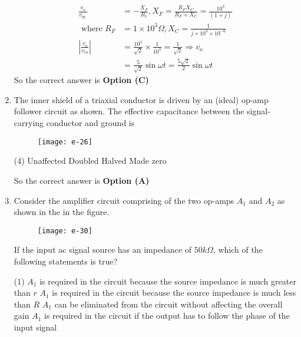 \begin{enumerate}
\begin{answer}
	\begin{align*}
	\frac{v_{o}}{v_{\text {in }}}&=-\frac{X_{F}}{R_{1}}, X_{F}=\frac{R_{F} X_{C}}{R_{F}+X_{C}}=\frac{10^{3}}{(1+j)}\\\text{ where }R_{F}&=1 \times 10^{3} \Omega, X_{C}=\frac{1}{j \times 10^{3} \times 10^{-6}}\\
	\left|\frac{v_{o}}{v_{i n}}\right|&=\frac{10^{3}}{\sqrt{2}} \times \frac{1}{10^{3}}=\frac{1}{\sqrt{2}} \Rightarrow v_{o}\\&=\frac{5}{\sqrt{2}} \sin \omega t=\frac{5 \sqrt{2}}{2} \sin \omega t
	\end{align*}
	So the correct answer is \textbf{Option (C)}
\end{answer}
	\item The inner shield of a triaxial conductor is driven by an (ideal) op-amp follower circuit as shown. The effective capacitance between the signal-carrying conductor and ground is
	{	}
	\begin{figure}[H]
		\centering
		\texttt{[image: e-26]}
	\end{figure}
	\begin{tasks}(4)
		\task[\textbf{A.}]  Unaffected
		\task[\textbf{B.}] Doubled
		\task[\textbf{C.}] Halved
		\task[\textbf{D.}] Made zero
	\end{tasks}
\begin{answer}
	So the correct answer is \textbf{Option (A)}
\end{answer}
	\item Consider the amplifier circuit comprising of the two op-amps $A_{1}$ and $A_{2}$ as shown in the in the figure. \\
	\begin{figure}[H]
		\centering
		\texttt{[image: e-30]}
	\end{figure}
	If the input ac signal source has an impedance of $50 k \Omega$, which of the following statements is true?
	{	}
	\begin{tasks}(1)
		\task[\textbf{A.}] $A_{1}$ is required in the circuit because the source impedance is much greater than $r$
		\task[\textbf{B.}] $A_{1}$ is required in the circuit because the source impedance is much less than $R$
		\task[\textbf{C.}] $A_{1}$ can be eliminated from the circuit without affecting the overall gain
		\task[\textbf{D.}] $A_{1}$ is required in the circuit if the output has to follow the phase of the input signal

\end{tasks}
\end{enumerate}
